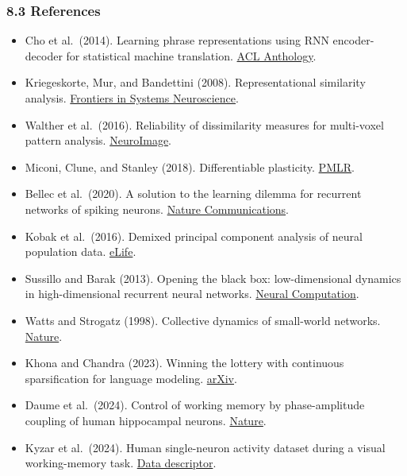 \documentclass[
  10pt,
]{article}
\providecommand{\tightlist}{%
  \setlength{\itemsep}{0pt}\setlength{\parskip}{0pt}}
\begin{document}
\hypertarget{references}{%
\subsubsection{8.3 References}\label{references}}

\begin{itemize}
\tightlist
\item
  Cho et al.~(2014). Learning phrase representations using RNN
  encoder-decoder for statistical machine translation.
  \href{https://doi.org/10.3115/v1/D14-1179}{ACL Anthology}.
\item
  Kriegeskorte, Mur, and Bandettini (2008). Representational similarity
  analysis. \href{https://doi.org/10.3389/neuro.06.004.2008}{Frontiers
  in Systems Neuroscience}.
\item
  Walther et al.~(2016). Reliability of dissimilarity measures for
  multi-voxel pattern analysis.
  \href{https://doi.org/10.1016/j.neuroimage.2015.12.012}{NeuroImage}.
\item
  Miconi, Clune, and Stanley (2018). Differentiable plasticity.
  \href{https://proceedings.mlr.press/v80/miconi18a.html}{PMLR}.
\item
  Bellec et al.~(2020). A solution to the learning dilemma for recurrent
  networks of spiking neurons.
  \href{https://doi.org/10.1038/s41467-020-17236-y}{Nature
  Communications}.
\item
  Kobak et al.~(2016). Demixed principal component analysis of neural
  population data. \href{https://doi.org/10.7554/eLife.10989}{eLife}.
\item
  Sussillo and Barak (2013). Opening the black box: low-dimensional
  dynamics in high-dimensional recurrent neural networks.
  \href{https://doi.org/10.1162/NECO_a_00409}{Neural Computation}.
\item
  Watts and Strogatz (1998). Collective dynamics of small-world
  networks. \href{https://doi.org/10.1038/30918}{Nature}.
\item
  Khona and Chandra (2023). Winning the lottery with continuous
  sparsification for language modeling.
  \href{https://arxiv.org/abs/2207.03523}{arXiv}.
\item
  Daume et al.~(2024). Control of working memory by phase-amplitude
  coupling of human hippocampal neurons.
  \href{https://doi.org/10.1038/s41586-024-07309-z}{Nature}.
\item
  Kyzar et al.~(2024). Human single-neuron activity dataset during a
  visual working-memory task.
  \href{https://pmc.ncbi.nlm.nih.gov/articles/PMC10796636/}{Data
  descriptor}.
\end{itemize}
\end{document}
